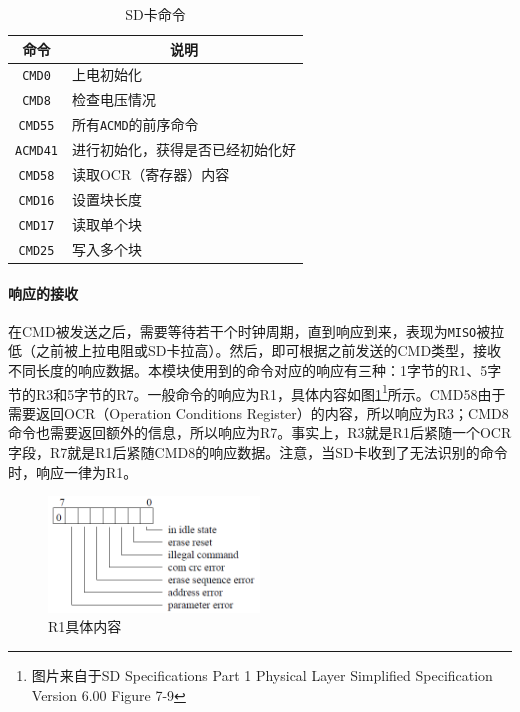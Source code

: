 \documentclass[11pt,utf8]{report}
\begin{document}
	\begin{table}[h]
	\centering
	\begin{tabular}{c|l}
	\toprule[1.2pt]
	\multicolumn{1}{c|}{\textbf{命令}} & \multicolumn{1}{c}{\textbf{说明}} \\
	\midrule[1.2pt]
	\texttt{CMD0} & 上电初始化 \\ \hline
	\texttt{CMD8} & 检查电压情况 \\ \hline
	\texttt{CMD55} & 所有\texttt{ACMD}的前序命令 \\ \hline
	\texttt{ACMD41} & 进行初始化，获得是否已经初始化好 \\ \hline
	\texttt{CMD58} & 读取OCR（寄存器）内容 \\ \hline
	\texttt{CMD16} & 设置块长度 \\ \hline
	\texttt{CMD17} & 读取单个块 \\ \hline
	\texttt{CMD25} & 写入多个块 \\
	\bottomrule[1.2pt]
	\end{tabular}
	\caption{SD卡命令}
	\label{cmds}
	\end{table}
	
	\paragraph{响应的接收} 在CMD被发送之后，需要等待若干个时钟周期，直到响应到来，表现为\texttt{MISO}被拉低（之前被上拉电阻或SD卡拉高）。然后，即可根据之前发送的CMD类型，接收不同长度的响应数据。本模块使用到的命令对应的响应有三种：1字节的R1、5字节的R3和5字节的R7。一般命令的响应为R1，具体内容如图\ref{r1}\footnote{图片来自于SD Specifications Part 1 Physical Layer Simplified Specification Version 6.00 Figure 7-9}所示。CMD58由于需要返回OCR（Operation Conditions Register）的内容，所以响应为R3；CMD8命令也需要返回额外的信息，所以响应为R7。事实上，R3就是R1后紧随一个OCR字段，R7就是R1后紧随CMD8的响应数据。注意，当SD卡收到了无法识别的命令时，响应一律为R1。
	
	\begin{figure}[h!]
		\centering
		\includegraphics[width=0.5\textwidth]{r1}
		\caption{R1具体内容}
		\label{r1}
	\end{figure}
\end{document}
